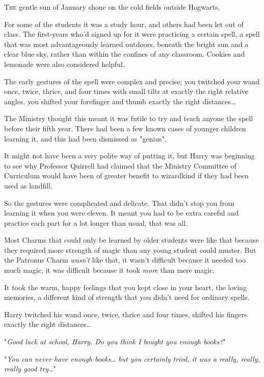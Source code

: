 
\lettrine{T}{he} gentle sun of 
January shone on the cold fields outside Hogwarts.

For some of the students it was a study hour, and others had been let out of 
class. The first-years who'd signed up for it were practicing a certain spell, 
a spell that was most advantageously learned outdoors, beneath the bright sun 
and a clear blue sky, rather than within the confines of any classroom. Cookies 
and lemonade were also considered helpful.

The early gestures of the spell were complex and precise; you twitched your 
wand once, twice, thrice, and four times with small tilts at exactly the right 
relative angles, you shifted your forefinger and thumb exactly the right 
distances{\ldots}

The Ministry thought this meant it was futile to try and teach anyone the spell 
before their fifth year. There had been a few known cases of younger children 
learning it, and this had been dismissed as "genius".

It might not have been a very polite way of putting it, but Harry was beginning 
to see why Professor Quirrell had claimed that the Ministry Committee of 
Curriculum would have been of greater benefit to wizardkind if they had been 
used as landfill.

So the gestures were complicated and delicate. That didn't stop you from 
learning it when you were eleven. It meant you had to be extra careful and 
practice each part for a lot longer than usual, that was all.

Most Charms that could only be learned by older students were like that because 
they required more strength of magic than any young student could muster. But 
the Patronus Charm \emph{wasn't} like that, it wasn't difficult because it 
needed too much magic, it was difficult because it took \emph{more} than mere 
magic.

It took the warm, happy feelings that you kept close in your heart, the loving 
memories, a different kind of strength that you didn't need for ordinary spells.

Harry twitched his wand once, twice, thrice and four times, shifted his fingers 
exactly the right distances{\ldots}

"\emph{Good luck at school, Harry. Do you think I bought you enough books?}"

"\emph{You can never have enough books{\ldots} but you certainly tried, it was 
a really, really, really good try{\ldots}}"

